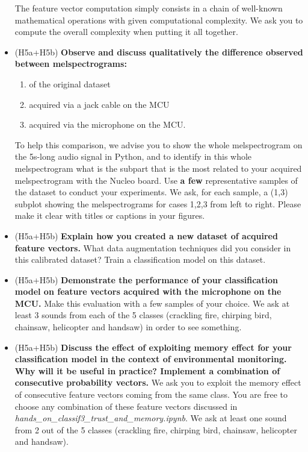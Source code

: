\begin{itemize}
The feature vector computation simply consists in a chain of well-known mathematical operations with given computational complexity. We ask you to compute the overall complexity when putting it all together.
\item (H5a+H5b) \textbf{Observe and discuss qualitatively the difference observed between melspectrograms:} 
\begin{enumerate}
    \item of the original dataset
    \item acquired via a jack cable on the MCU
    \item acquired via the microphone on the MCU.
   \end{enumerate}
   To help this comparison, we advise you to show the whole melspectrogram on the 5s-long audio signal in Python, and to identify in this whole melspectrogram what is the subpart that is the most related to your acquired melspectrogram with the Nucleo board.
     Use \textbf{a few} representative samples of the dataset to conduct your experiments.
       We ask, for each sample, a (1,3) subplot showing the melspectrograms for cases 1,2,3 from left to right. Please make it clear with titles or captions in your figures.
    \item (H5a+H5b) \textbf{Explain how you created a new dataset of acquired feature vectors.} What data augmentation techniques did you consider in this calibrated dataset? Train a classification model on this dataset. 
    \item (H5a+H5b) \textbf{Demonstrate the performance of your classification model on feature vectors acquired with the microphone on the MCU.}
    Make this evaluation with a few samples of your choice. We ask at least 3 sounds from each of the 5 classes (crackling fire, chirping bird, chainsaw, helicopter and handsaw) in order to see something.
    \item (H5a+H5b) \textbf{Discuss the effect of exploiting memory effect for your classification model in the context of environmental monitoring. Why will it be useful in practice? Implement a combination of consecutive probability vectors.} We ask you to exploit the memory effect of consecutive feature vectors coming from the same class. You are free to choose any combination of these feature vectors discussed in \emph{hands\_on\_classif3\_trust\_and\_memory.ipynb}. We ask at least one sound from 2 out of the 5 classes (crackling fire, chirping bird, chainsaw, helicopter and handsaw).
\end{itemize}
